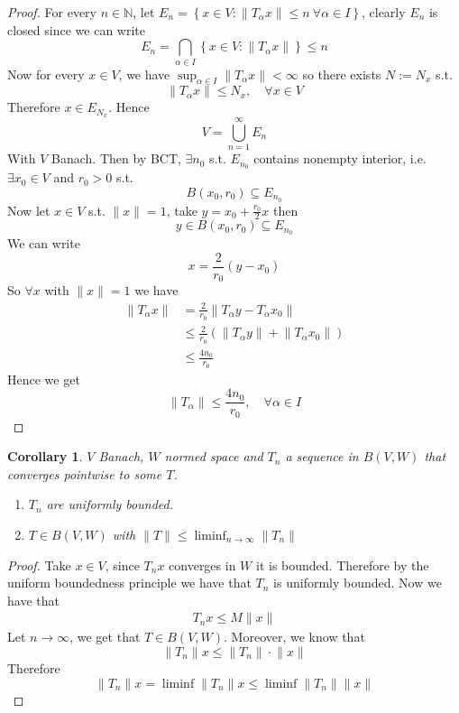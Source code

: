 \documentclass[11pt,a4paper]{article}
\theoremstyle{definition}
\theoremstyle{plain}
\newtheorem{corollary}[definition]{Corollary}
\theoremstyle{remark}
\newcommand{\N}{\mathbb{N}}
\renewcommand{\set}[1]{\left\{ #1 \right\}}
\newcommand{\norm}[1]{\lVert #1 \rVert}
\newcommand{\1}{\mathbbm{1}}
\begin{document}
\begin{proof}
    For every $n \in \N$, let $E_n = \set{x \in V \colon \norm{T_\alpha x} \le n \ \forall \alpha \in I}$, clearly $E_n$ is closed since we can write 
    $$E_n = \bigcap_{\alpha \in I} \set{x \in V \colon \norm{T_\alpha x}} \le n$$
    Now for every $x \in V$, we have $\sup_{\alpha \in I} \norm{T_\alpha x} < \infty$ so there exists $N := N_x $ s.t. 
    $$\norm{T_\alpha x} \le N_x, \quad \forall x \in V$$
    Therefore $x \in E_{N_x}$. Hence 
    $$V = \bigcup_{n=1}^\infty E_n$$ 
    With $V$ Banach. Then by BCT, $\exists n_0$ s.t. $E_{n_0}$ contains nonempty interior, i.e. $\exists x_0 \in V$ and $r_0 > 0$ s.t. 
    $$B(x_0, r_0) \subseteq E_{n_0}$$
    Now let $x \in V$ s.t. $\norm{x} = 1$, take $y = x_0 + \frac{r_0}{2} x$ then 
    $$y \in B(x_0, r_0) \subseteq E_{n_0}$$
    We can write 
    $$x = \frac{2}{r_0} (y - x_0)$$
    So $\forall x$ with $\norm{x} = 1$ we have 
    \begin{align*}
        \norm{T_\alpha x} &= \frac{2}{r_0} \norm{T_\alpha y - T_\alpha x_0} \\
        &\le \frac{2}{r_0} \left(\norm{T_\alpha y} + \norm{T_\alpha x_0}\right) \\
        &\le \frac{4 n_0}{r_0}
    \end{align*}
    Hence we get 
    $$\norm{T_\alpha} \le \frac{4 n_0}{r_0}, \quad \forall \alpha \in I$$ 
\end{proof}

\begin{corollary}
    $V$ Banach, $W$ normed space and $T_n$ a sequence in $B(V, W)$ that converges pointwise to some $T$. 
    \begin{enumerate}[label = \roman*)]
        \item $T_n$ are uniformly bounded. 
        \item $T \in B(V, W)$ with $\norm{T} \le \liminf_{n \to \infty} \norm{T_n}$
    \end{enumerate}
\end{corollary}

\begin{proof}
    Take $x \in V$, since $T_n x$ converges in $W$ it is bounded. Therefore by the uniform boundedness principle we have that $T_n$ is uniformly bounded. 
    Now we have that 
    \begin{align*}
        T_n x \le M \norm{x}
    \end{align*}
    Let $n \to \infty$, we get that $T \in B(V, W)$. Moreover, we know that 
    $$\norm{T_n} x \le \norm{T_n} \cdot \norm{x}$$
    Therefore 
    $$\norm{T_n} x = \liminf \norm{T_n} x \le \liminf \norm{T_n} \norm{x}$$
\end{proof}
\end{document}
